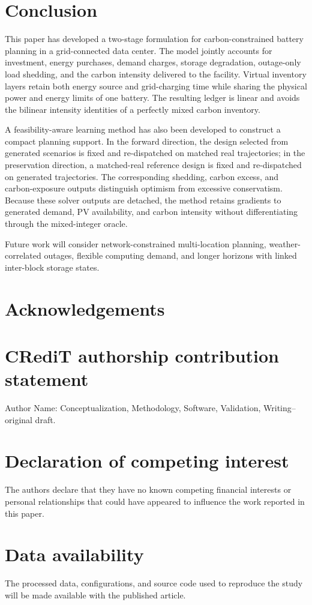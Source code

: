 \documentclass[times]{elsarticle}
\begin{document}
\section{Conclusion}
\label{sec:conclusion}

This paper has developed a two-stage formulation for carbon-constrained battery
planning in a grid-connected data center. The model jointly accounts for
investment, energy purchases, demand charges, storage degradation, outage-only
load shedding, and the carbon intensity delivered to the facility. Virtual
inventory layers retain both energy source and grid-charging time while sharing
the physical power and energy limits of one battery. The resulting ledger is
linear and avoids the bilinear intensity identities of a perfectly mixed carbon
inventory.

A feasibility-aware learning method has also been developed to construct a
compact planning support. In the forward direction, the design selected from
generated scenarios is fixed and re-dispatched on matched real trajectories; in
the preservation direction, a matched-real reference design is fixed and
re-dispatched on generated trajectories. The corresponding shedding, carbon
excess, and carbon-exposure outputs distinguish optimism from excessive
conservatism. Because these solver outputs are detached, the method retains
gradients to generated demand, PV availability, and carbon intensity without
differentiating through the mixed-integer oracle.


Future work will consider network-constrained multi-location planning,
weather-correlated outages, flexible computing demand, and longer horizons with
linked inter-block storage states.

\section*{Acknowledgements}

\section*{CRediT authorship contribution statement}
Author Name: Conceptualization, Methodology, Software, Validation,
Writing--original draft.

\section*{Declaration of competing interest}
The authors declare that they have no known competing financial interests or
personal relationships that could have appeared to influence the work reported
in this paper.

\section*{Data availability}
The processed data, configurations, and source code used to reproduce the study
will be made available with the published article.



\end{document}
